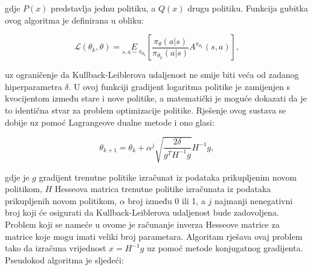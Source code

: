 \documentclass[times,utf8,diplomski]{fer}
\begin{document}
\noindent gdje ${P(x)}$ predstavlja jednu politiku, a ${Q(x)}$ drugu politiku. Funkcija gubitka ovog algoritma je definirana u obliku:

\begin{equation}
	\label{TRPO loss}
	{\mathcal L}(\theta_k, \theta) = \underset{s,a \sim \pi_{\theta_k}}E[\frac{\pi_{\theta}(a|s)}{\pi_{\theta_k}(a|s)} A^{\pi_{\theta_k}}(s,a)],
\end{equation}

\noindent uz ograničenje da Kullback-Leiblerova udaljenost ne smije biti veća od zadanog hiperparametra ${\delta}$. U ovoj funkciji gradijent logaritma politike je zamijenjen s kvocijentom između stare i nove politike, a matematički je moguće dokazati da je to identična stvar za problem optimizacije politike. Rješenje ovog sustava se dobije uz pomoć Lagrangeove dualne metode i ono glasi:

\begin{equation}
	\label{TRPO rješenje}
	\theta_{k+1} = \theta_k + \alpha^j \sqrt{\frac{2 \delta}{g^T H^{-1} g}} H^{-1} g,
\end{equation}

\noindent gdje je ${g}$ gradijent trenutne politike izračunat iz podataka prikupljenim novom politikom, ${H}$ Hesseova matrica trenutne politike izračunata iz podataka prikupljenih novom politikom, ${\alpha}$ broj između 0 ili 1, a ${j}$ najmanji nenegativni broj koji će osigurati da Kullback-Leiblerova udaljenost bude zadovoljena. Problem koji se nameće u ovome je računanje inverza Hesseove matrice za matrice koje mogu imati veliki broj parametara. Algoritam rješava ovaj problem tako da izračuna vrijednost ${x = H^{-1}g}$ uz pomoć metode konjugatnog gradijenta. Pseudokod algoritma je sljedeći:
\end{document}

